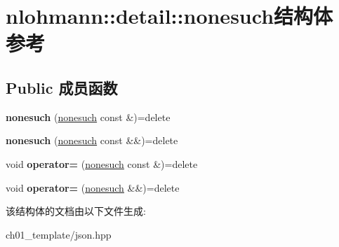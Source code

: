\hypertarget{structnlohmann_1_1detail_1_1nonesuch}{}\section{nlohmann\+::detail\+::nonesuch结构体 参考}
\label{structnlohmann_1_1detail_1_1nonesuch}
\subsection*{Public 成员函数}
\begin{DoxyCompactItemize}
\item 
\mbox{\label{structnlohmann_1_1detail_1_1nonesuch_a563462ef2d05fe60cdf1dc7f567dc276}} 
{\bfseries nonesuch} (\mbox{\hyperlink{structnlohmann_1_1detail_1_1nonesuch}{nonesuch}} const \&)=delete
\item 
\mbox{\label{structnlohmann_1_1detail_1_1nonesuch_ad7719f7d2a00263be8b8d123870217d8}} 
{\bfseries nonesuch} (\mbox{\hyperlink{structnlohmann_1_1detail_1_1nonesuch}{nonesuch}} const \&\&)=delete
\item 
\mbox{\label{structnlohmann_1_1detail_1_1nonesuch_add6ef84c52a851e391cef514c85f2ffe}} 
void {\bfseries operator=} (\mbox{\hyperlink{structnlohmann_1_1detail_1_1nonesuch}{nonesuch}} const \&)=delete
\item 
\mbox{\label{structnlohmann_1_1detail_1_1nonesuch_a78ca022a1b4defe4f7ba662843602231}} 
void {\bfseries operator=} (\mbox{\hyperlink{structnlohmann_1_1detail_1_1nonesuch}{nonesuch}} \&\&)=delete
\end{DoxyCompactItemize}


该结构体的文档由以下文件生成\+:\begin{DoxyCompactItemize}
\item 
ch01\+\_\+template/json.\+hpp\end{DoxyCompactItemize}
